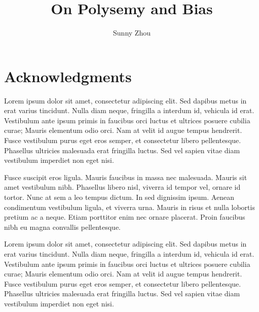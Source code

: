 \documentclass{brandeis-thesis3.2}
\title{On Polysemy and Bias}
\author{Sunny Zhou}
\theoremstyle{plain}
\theoremstyle{definition}
\theoremstyle{remark}
\numberwithin{equation}{section}
\begin{document}
\maketitlepage

\chapter*{Acknowledgments}

\begin{doublespacing}

Lorem ipsum dolor sit amet, consectetur adipiscing elit. Sed dapibus metus in erat varius tincidunt. Nulla diam neque, fringilla a interdum id, vehicula id erat. Vestibulum ante ipsum primis in faucibus orci luctus et ultrices posuere cubilia curae; Mauris elementum odio orci. Nam at velit id augue tempus hendrerit. Fusce vestibulum purus eget eros semper, et consectetur libero pellentesque. Phasellus ultricies malesuada erat fringilla luctus. Sed vel sapien vitae diam vestibulum imperdiet non eget nisi.

Fusce suscipit eros ligula. Mauris faucibus in massa nec malesuada. Mauris sit amet vestibulum nibh. Phasellus libero nisl, viverra id tempor vel, ornare id tortor. Nunc at sem a leo tempus dictum. In sed dignissim ipsum. Aenean condimentum vestibulum ligula, et viverra urna. Mauris in risus et nulla lobortis pretium ac a neque. Etiam porttitor enim nec ornare placerat. Proin faucibus nibh eu magna convallis pellentesque.

\end{doublespacing}

\clearpage

\begin{thesis-abstract}
Lorem ipsum dolor sit amet, consectetur adipiscing elit. Sed dapibus metus in erat varius tincidunt. Nulla diam neque, fringilla a interdum id, vehicula id erat. Vestibulum ante ipsum primis in faucibus orci luctus et ultrices posuere cubilia curae; Mauris elementum odio orci. Nam at velit id augue tempus hendrerit. Fusce vestibulum purus eget eros semper, et consectetur libero pellentesque. Phasellus ultricies malesuada erat fringilla luctus. Sed vel sapien vitae diam vestibulum imperdiet non eget nisi.

\end{thesis-abstract}

\end{document}

